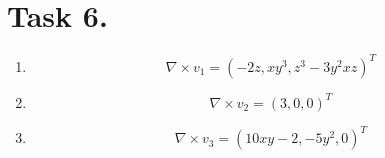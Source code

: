 \documentclass[a4paper,11pt]{article}
\begin{document}
\section*{Task 6.}
\begin{enumerate}
    \item 
        \[
            \nabla \times v_1 = (-2z, xy^3, z^3-3y^2xz)^{T}
        \]
    \item 
        \[
            \nabla \times v_2 = (3, 0, 0)^{T}
        \]
    \item 
        \[
            \nabla \times v_3 = (10xy-2, -5y^2, 0)^{T}
        \]
\end{enumerate}
\end{document}
